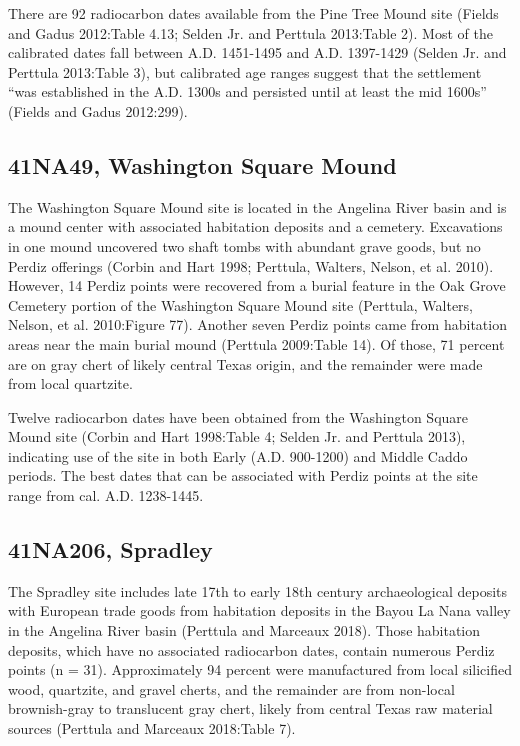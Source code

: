 \documentclass[review]{elsarticle}
\begin{document}
There are 92 radiocarbon dates available from the Pine Tree Mound site (Fields and Gadus 2012:Table 4.13; Selden Jr. and Perttula 2013:Table 2). Most of the calibrated dates fall between A.D. 1451-1495 and A.D. 1397-1429 (Selden Jr. and Perttula 2013:Table 3), but calibrated age ranges suggest that the settlement “was established in the A.D. 1300s and persisted until at least the mid 1600s” (Fields and Gadus 2012:299).

\subsection*{41NA49, Washington Square Mound}

The Washington Square Mound site is located in the Angelina River basin and is a mound center with associated habitation deposits and a cemetery. Excavations in one mound uncovered two shaft tombs with abundant grave goods, but no Perdiz offerings (Corbin and Hart 1998; Perttula, Walters, Nelson, et al. 2010). However, 14 Perdiz points were recovered from a burial feature in the Oak Grove Cemetery portion of the Washington Square Mound site (Perttula, Walters, Nelson, et al. 2010:Figure 77). Another seven Perdiz points came from habitation areas near the main burial mound  (Perttula 2009:Table 14). Of those, 71 percent are on gray chert of likely central Texas origin, and the remainder were made from local quartzite.

Twelve radiocarbon dates have been obtained from the Washington Square Mound site (Corbin and Hart 1998:Table 4; Selden Jr. and Perttula 2013), indicating use of the site in both Early (A.D. 900-1200) and Middle Caddo periods. The best dates that can be associated with Perdiz points at the site range from cal. A.D. 1238-1445.

\subsection*{41NA206, Spradley}

The Spradley site includes late 17th to early 18th century archaeological deposits with European trade goods from habitation deposits in the Bayou La Nana valley in the Angelina River basin (Perttula and Marceaux 2018). Those habitation deposits, which have no associated radiocarbon dates, contain numerous Perdiz points (n = 31). Approximately 94 percent were manufactured from local silicified wood, quartzite, and gravel cherts, and the remainder are from non-local brownish-gray to translucent gray chert, likely from central Texas raw material sources (Perttula and Marceaux 2018:Table 7).
\end{document}
